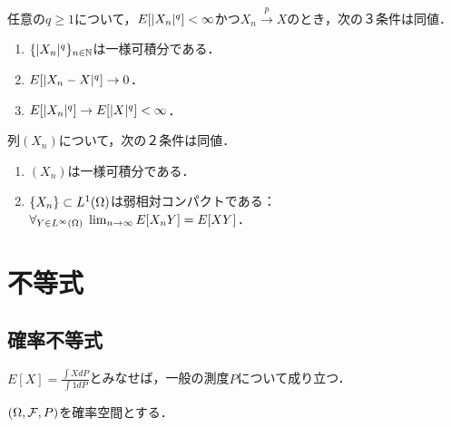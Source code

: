\documentclass[uplatex,dvipdfmx]{jsreport}
\begin{document}
\begin{corollary}[さらに一般化]
    任意の$q\ge1$について，$E[\lvert X_n\rvert^q]<\infty$かつ$X_n\xrightarrow{p}X$のとき，次の３条件は同値．
    \begin{enumerate}
        \item $\{\lvert X_n\rvert^q\}_{n\in\mathbb{N}}$は一様可積分である．
        \item $E[\lvert X_n-X\rvert^q]\to0$．
        \item $E[\lvert X_n\rvert^q]\to E[\lvert X\rvert^q]<\infty$．
    \end{enumerate}
\end{corollary}

\begin{theorem}
    列$(X_n)$について，次の２条件は同値．
    \begin{enumerate}
        \item $(X_n)$は一様可積分である．
        \item $\{X_n\}\subset L^1(\Omega)$は弱相対コンパクトである：$\forall_{Y\in L^\infty(\Omega)}\;\lim_{n\to\infty}E[X_nY]=E[XY]$．
    \end{enumerate}
\end{theorem}

\section{不等式}

\subsection{確率不等式}

\begin{tcolorbox}[colframe=ForestGreen, colback=ForestGreen!10!white,breakable,colbacktitle=ForestGreen!40!white,coltitle=black,fonttitle=\bfseries\sffamily,
title=]
    $E[X]=\frac{\int XdP}{\int 1dP}$とみなせば，一般の測度$P$について成り立つ．
\end{tcolorbox}

\begin{notation}
    $(\Omega,\mathcal{F},P)$を確率空間とする．
\end{notation}
\end{document}
